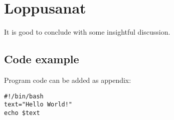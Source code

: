 \documentclass[finnish,twoside,openright]{HYgraduMLDS}
\begin{document}
\chapter{Loppusanat\label{chapter:Loppusanat}}

It is good to conclude with some insightful discussion. 


\cleardoublepage %



\begin{appendices}
\myappendixtitle

\chapter{Code example\label{appendix:code}}
Program code can be added as appendix:
\begin{verbatim}
#!/bin/bash          
text="Hello World!"
echo $text
\end{verbatim}

\end{appendices}
\end{document}

